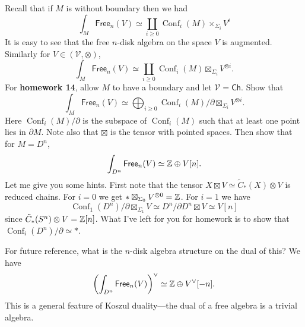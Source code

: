 \documentclass{amsart}
\DeclareMathOperator{\Conf}{Conf}
\begin{document}
\begin{exercise}
    Recall that if $M$ is without boundary then we had
    \begin{equation*}
        \int_M \mathsf{Free}_n(V) \simeq \coprod_{i\geq 0}\Conf_i(M)\times_{\Sigma_i}V^i
    \end{equation*}
    It is easy to see that the free $n$-disk algebra on the space $V$ is augmented. Similarly
    for $V\in(\mathcal{V},\otimes)$,
    \begin{equation*}
        \int_M \mathsf{Free}_n(V) \simeq \coprod_{i\geq 0} \Conf_i(M)\boxtimes_{\Sigma_i}V^{\otimes i}.
    \end{equation*}
    For \textbf{homework 14}, allow $M$ to have a boundary and let $\mathcal{V}=\mathsf{Ch}$. Show that
    \begin{equation*}
        \int_M\mathsf{Free}_n(V) \simeq \bigoplus_{i\geq 0}\Conf_i(M)/\partial \boxtimes_{\Sigma_i} V^{\otimes i}.
    \end{equation*}
    Here $\Conf_i(M)/\partial$ is the subspace of $\Conf_i(M)$ such that at least one point
    lies in $\partial M$. Note also that $\boxtimes$ is the tensor with pointed spaces.
    Then show that for $M=D^n$,
    \begin{equation*}
        \int_{D^n} \mathsf{Free}_n(V) \simeq \mathbb{Z}\oplus V[n].
    \end{equation*}
    Let me give you some hints. First note that the tensor $X\boxtimes V\simeq \tilde C_*(X)\otimes V$
    is reduced chains.
    For $i=0$ we get $*\boxtimes_{\Sigma_0}V^{\otimes 0}=\mathbb{Z}$. For $i=1$ we have
    \begin{equation*}
        \Conf_1(D^n)/\partial \boxtimes_{\Sigma_1}V \simeq D^n/\partial D^n\boxtimes V\simeq V[n]
    \end{equation*}
    since $\tilde C_*(S^n)\otimes V=\mathbb{Z}[n]$. What I've left for you for homework is to show
    that $\Conf_i(D^n)/\partial\simeq *$.

    For future reference, what is the $n$-disk algebra structure on the dual of this? We have
    \begin{equation*}
        \left( \int_{D^n}\mathsf{Free}_n(V) \right)^\vee \simeq \mathbb{Z}\oplus V^\vee[-n].
    \end{equation*}
    This is a general feature of Koszul duality---the dual of a free algebra is a trivial
    algebra.
\end{exercise}


\newpage
\end{document}
